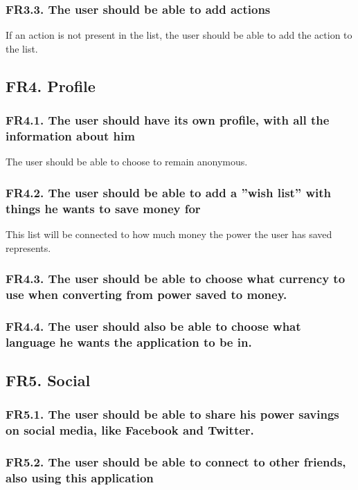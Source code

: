 \subsubsection{FR3.3. The user should be able to add actions}
If an action is not present in the list, the user should be able to add the action to the list.



\subsection{FR4. Profile}

\subsubsection{FR4.1. The user should have its own profile, with all the information about him}
The user should be able to choose to remain anonymous.

\subsubsection{FR4.2. The user should be able to add a ''wish list'' with things he wants to save money for}
This list will be connected to how much money the power the user has saved represents.

\subsubsection{FR4.3. The user should be able to choose what currency to use when converting from power saved to money.}

\subsubsection{FR4.4. The user should also be able to choose what language he wants the application to be in.}


\subsection{FR5. Social}
\subsubsection{FR5.1. The user should be able to share his power savings on social media, like Facebook and Twitter.}

\subsubsection{FR5.2. The user should be able to connect to other friends, also using this application}

